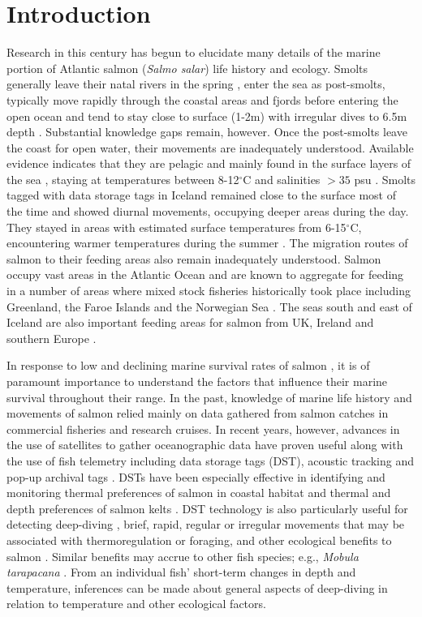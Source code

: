 \section{Introduction}
\label{intro}
Research in this century has begun to elucidate many details of the marine portion of Atlantic salmon (\textit{Salmo salar}) life history and ecology. 
Smolts generally leave their natal rivers in the spring \citep{Otero2014}, enter the sea as post-smolts, typically move rapidly through the coastal areas and fjords before entering the open ocean \citep{Thorstad2011,Lacroix2004,Gudjonsson2005} and tend to stay close to surface (1-2m) with irregular dives to 6.5m depth \citep{Davidsen2008}.  
Substantial knowledge gaps remain, however. 
Once the post-smolts leave the coast for open water, their movements are inadequately understood. 
Available evidence indicates that they are pelagic and mainly found in the surface layers of the sea \citep{Holm2006}, staying at temperatures between 8-12$^\circ$C \citep{Friedland2000} and salinities $> 35$ psu \citep{Holm2003}. 
Smolts tagged with data storage tags in Iceland remained close to the surface most of the time and showed diurnal movements, occupying deeper areas during the day. They stayed in areas with estimated surface temperatures from 6-15$^\circ$C, encountering warmer temperatures during the summer \citep{Gudjonsson2015}. 
The migration routes of salmon to their feeding areas also remain inadequately understood. 
Salmon occupy vast areas in the Atlantic Ocean and are known to aggregate for feeding in a number of areas where mixed stock fisheries historically took place including Greenland, the Faroe Islands and the Norwegian Sea \citep{Chaput2012}. 
The seas south and east of Iceland are also important feeding areas for salmon from UK, Ireland and southern Europe \citep{Olafsson2015}. 

In response to low and declining marine survival rates of salmon \citep{Chaput2012}, it is of paramount importance to understand the factors that influence their marine survival throughout their range. 
In the past, knowledge of marine life history and movements of salmon relied mainly on data gathered from salmon catches in commercial fisheries and research cruises. 
In recent years, however, advances in the use of satellites to gather oceanographic data have proven useful along with the use of fish telemetry including data storage tags (DST), acoustic tracking and pop-up archival tags \citep{Lacroix2013}. 
DSTs have been especially effective in identifying and monitoring thermal preferences of salmon in coastal habitat \citep{Reddin2004,Reddin2006} and thermal and depth preferences of salmon kelts \citep{Reddin2011,Chittenden2013,Strom2017}. DST technology is also particularly useful for detecting deep-diving , brief, rapid, regular or irregular movements that may be associated with thermoregulation or foraging, and other ecological benefits to salmon \citep{Reddin2006}. 
Similar benefits may accrue to  other fish species; e.g., \textit{Mobula tarapacana} \citep{Thorrold2014}. 
From an  individual fish' short-term changes in depth and temperature, inferences can be made about general aspects of deep-diving in relation to temperature and other ecological factors.

